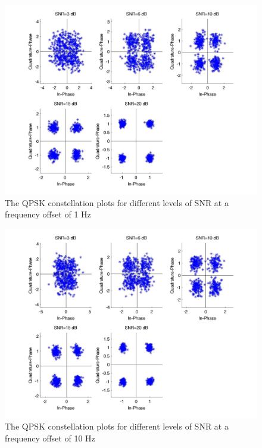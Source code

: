 \documentclass[]{article}
\begin{document}
\begin{figure}[H]
\centering
\hspace*{-2cm}\includegraphics[width=1.3\textwidth]{qpConstfo3.jpg}
\caption{The QPSK constellation plots for different levels of SNR at a frequency offset of 1 Hz}
\end{figure}

\begin{figure}[H]
\centering
\hspace*{-2cm}\includegraphics[width=1.3\textwidth]{qpConstfo4.jpg}
\caption{The QPSK constellation plots for different levels of SNR at a frequency offset of 10 Hz}
\end{figure}
\end{document}
